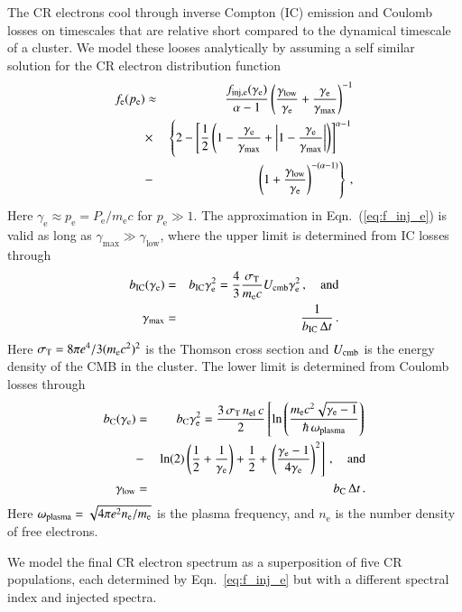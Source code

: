 \documentclass[useAMS,usenatbib]{mn2e}
\newcommand{\e}{\mathrm{e}}
\newcommand{\IC}{\mathrm{IC}}
\newcommand{\ma}{\mathrm{max}}
\newcommand{\low}{\mathrm{low}}
\begin{document}
The CR electrons cool through inverse Compton (IC) emission and
Coulomb losses on timescales that are relative short compared to the
dynamical timescale of a cluster. We model these looses analytically
by assuming a self similar solution for the CR electron distribution
function \citep{1999ApJ...520..529S}
\begin{eqnarray}
  \label{eq:f_inj_e}
  f_\e(p_\e) &\approx& \frac{f_\rmn{inj,e}(\gamma_\e)}{\alpha-1}
\left(\frac{\gamma_\low}{\gamma_\e}+\frac{\gamma_\e }{\gamma_\ma}\right)^{-1}
\nonumber\\
&\times& \left\{2-\left[\frac{1}{2}\left(1-\frac{\gamma_\e}{\gamma_\ma}+
\left|1-\frac{\gamma_\e}{\gamma_\ma}\right|\right)\right]^{\alpha-1}\right.
\nonumber\\
&-& \left.\left(1+\frac{\gamma_\low}{\gamma_\e}\right)^{-(\alpha-1)}\right\}\,,
\end{eqnarray}
Here $\gamma_\e \approx p_\e = P_\e/m_\e c$ for $ p_\e \gg 1$.  The
approximation in Eqn.~(\ref{eq:f_inj_e}) is valid as long as
$\gamma_\ma\gg \gamma_\low$, where the upper limit is determined from
IC losses through
\begin{eqnarray}
  \label{eq:gamma_max}
b_\IC(\gamma_\e) &=& b_\IC \gamma_\e^2 
= \frac{4}{3}\frac{\sigma_\rmn{T}}{m_\e c} U_\rmn{cmb} \gamma_\e^2 \,,\quad \rmn{and}\nonumber \\
\gamma_\ma &=& \frac{1}{b_\IC\,\Delta t}\,.
\end{eqnarray}
Here $\sigma_\rmn{T}= 8\pi e^4/3(m_\e c^2)^2$ is the Thomson cross
section and $U_{\mathrm{cmb}}$ is the energy density of the CMB in the
cluster. The lower limit is determined from Coulomb losses through
\begin{eqnarray}
  \label{eq:gamma_min}
b_\rmn{C}(\gamma_\e) &=& b_\rmn{C} \gamma_\e^2 
= \frac{3\,\sigma_\rmn{T}\,n_\rmn{el}\,c}{2}
\left[\ln\left(\frac{m_\e c^2 \sqrt{\gamma_\e-1}}{\hbar\,\omega_\rmn{plasma}}\right)\right.\nonumber \\
  &-&\ln(2)\left(\frac{1}{2}+\frac{1}{\gamma_\e}\right)+\frac{1}{2}+
\left.\left(\frac{\gamma_\e-1}{4\gamma_\e}\right)^2\right]
         \,,\quad \rmn{and}\nonumber \\
\gamma_\low &=& b_\rmn{C}\,\Delta t\,.
\end{eqnarray}
Here $\omega_\rmn{plasma} = \sqrt{4\pi e^2 n_\e / m_\e}$ is the plasma
frequency, and $n_\e$ is the number density of free electrons.

We model the final CR electron spectrum as a superposition of five CR
populations, each determined by Eqn.~\ref{eq:f_inj_e} but with a
different spectral index and injected spectra.
\end{document}
